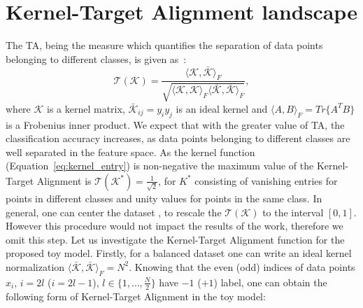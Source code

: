 \documentclass{article}
\begin{document}
\section{Kernel-Target Alignment landscape}
The TA, being the measure which quantifies the separation of data points belonging to different classes, is given as~\cite{cristianini2001kernel}:
\begin{equation}\label{eq:target_alignment}
\mathcal{T}(\mathcal{K}) = \frac{\langle \mathcal{K}, \bar{\mathcal{K}} \rangle_F}{\sqrt{\langle \mathcal{K}, \mathcal{K} \rangle_F \langle \bar{\mathcal{K}}, \bar{\mathcal{K}} \rangle_F}},
\end{equation}
where $\mathcal{K}$ is a kernel matrix, $\bar{\mathcal{K}}_{ij} = y_i y_j$ is an ideal kernel and  $\langle A, B\rangle_F = Tr\{ A^T B \}$ is a Frobenius inner product. 
We expect that with the greater value of TA, the classification accuracy increases, as data points belonging to different classes are well separated in the feature space.
As the kernel function (Equation~\ref{eq:kernel_entry}) is non-negative the maximum value of the Kernel-Target Alignment is $\mathcal{T}(\mathcal{K^*}) = \frac{1}{\sqrt{2}}$, for $K^*$ consisting of vanishing entries for points in different classes and unity values for points in the same class. In general, one can center the dataset \cite{scholkopf1998nonlinear}, to rescale the $\mathcal{T}(\mathcal{K})$ to the interval $[0,1]$. However this procedure would not impact the results of the work, therefore we omit this step.
Let us investigate the Kernel-Target Alignment function for the proposed toy model. Firstly, for a balanced dataset one can write an ideal kernel normalization $\langle \bar{\mathcal{K}},\bar{\mathcal{K}} \rangle_F = N^2$.
Knowing that the even (odd) indices of data points $x_i$, $i = 2l$ ($i = 2l-1$), $l \in \{1,\dots, \frac{N}{2}\}$ have $-1$ ($+1$) label, one can obtain the following form of Kernel-Target Alignment in the toy model:
\end{document}
